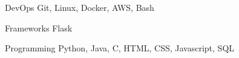 

\begin{cvskills}


  \cvskill
    {DevOps} %
    {Git, Linux, Docker, AWS, Bash} %

  \cvskill
    {Frameworks} %
    {Flask} %

  \cvskill
    {Programming} %
    {Python, Java, C, HTML, CSS, Javascript, SQL} %


\end{cvskills}
